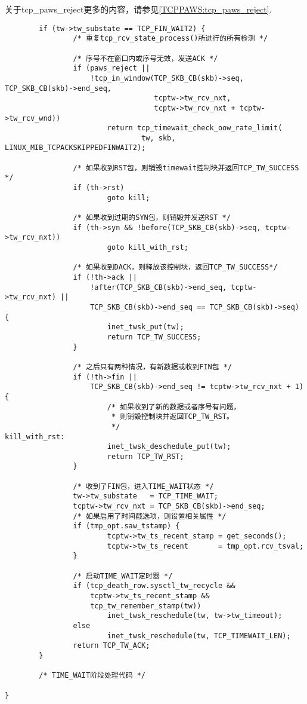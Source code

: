 	关于tcp\_paws\_reject更多的内容，请参见\ref{TCPPAWS:tcp_paws_reject}.
\begin{verbatim}
        if (tw->tw_substate == TCP_FIN_WAIT2) {
                /* 重复tcp_rcv_state_process()所进行的所有检测 */

                /* 序号不在窗口内或序号无效，发送ACK */
                if (paws_reject ||
                    !tcp_in_window(TCP_SKB_CB(skb)->seq, TCP_SKB_CB(skb)->end_seq,
                                   tcptw->tw_rcv_nxt,
                                   tcptw->tw_rcv_nxt + tcptw->tw_rcv_wnd))
                        return tcp_timewait_check_oow_rate_limit(
                                tw, skb, LINUX_MIB_TCPACKSKIPPEDFINWAIT2);

                /* 如果收到RST包，则销毁timewait控制块并返回TCP_TW_SUCCESS */
                if (th->rst)
                        goto kill;

                /* 如果收到过期的SYN包，则销毁并发送RST */
                if (th->syn && !before(TCP_SKB_CB(skb)->seq, tcptw->tw_rcv_nxt))
                        goto kill_with_rst;

                /* 如果收到DACK，则释放该控制块，返回TCP_TW_SUCCESS*/
                if (!th->ack ||
                    !after(TCP_SKB_CB(skb)->end_seq, tcptw->tw_rcv_nxt) ||
                    TCP_SKB_CB(skb)->end_seq == TCP_SKB_CB(skb)->seq) {
                        inet_twsk_put(tw);
                        return TCP_TW_SUCCESS;
                }

                /* 之后只有两种情况，有新数据或收到FIN包 */
                if (!th->fin ||
                    TCP_SKB_CB(skb)->end_seq != tcptw->tw_rcv_nxt + 1) {
                        /* 如果收到了新的数据或者序号有问题，
                         * 则销毁控制块并返回TCP_TW_RST。 
                         */
kill_with_rst:
                        inet_twsk_deschedule_put(tw);
                        return TCP_TW_RST;
                }

                /* 收到了FIN包，进入TIME_WAIT状态 */
                tw->tw_substate   = TCP_TIME_WAIT;
                tcptw->tw_rcv_nxt = TCP_SKB_CB(skb)->end_seq;
                /* 如果启用了时间戳选项，则设置相关属性 */
                if (tmp_opt.saw_tstamp) {
                        tcptw->tw_ts_recent_stamp = get_seconds();
                        tcptw->tw_ts_recent       = tmp_opt.rcv_tsval;
                }

                /* 启动TIME_WAIT定时器 */
                if (tcp_death_row.sysctl_tw_recycle &&
                    tcptw->tw_ts_recent_stamp &&
                    tcp_tw_remember_stamp(tw))
                        inet_twsk_reschedule(tw, tw->tw_timeout);
                else
                        inet_twsk_reschedule(tw, TCP_TIMEWAIT_LEN);
                return TCP_TW_ACK;
        }

        /* TIME_WAIT阶段处理代码 */

}
\end{verbatim}


